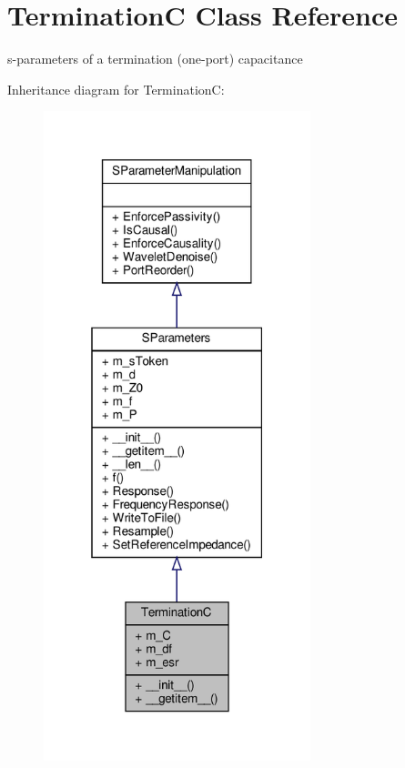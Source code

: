 \hypertarget{classSignalIntegrity_1_1SParameters_1_1Devices_1_1TerminationC_1_1TerminationC}{}\section{TerminationC Class Reference}
\label{classSignalIntegrity_1_1SParameters_1_1Devices_1_1TerminationC_1_1TerminationC}


s-\/parameters of a termination (one-\/port) capacitance  




Inheritance diagram for TerminationC\+:\nopagebreak
\begin{figure}[H]
\begin{center}
\leavevmode
\includegraphics[width=220pt]{classSignalIntegrity_1_1SParameters_1_1Devices_1_1TerminationC_1_1TerminationC__inherit__graph}
\end{center}
\end{figure}


